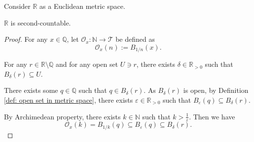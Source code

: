 \begin{proposition}
	Consider $\mathbb R$ as a Euclidean metric space.
	
	$\mathbb R$ is second-countable.
	
	\begin{proof}
		For any $x \in \mathbb Q$, let $\mathcal O_x: \mathbb N \to \mathcal T$ be defined as
		$$
		\mathcal O_x(n) := B_{1/n}(x).
		$$
		
		For any $r \in \mathbb R \setminus \mathbb Q$ and for any open set $U \ni r$, there exists $\delta \in \mathbb R_{> 0}$ such that $B_\delta(r) \subseteq U$.
		
		There exists some $q \in \mathbb Q$ such that $q \in B_\delta(r)$. As $B_\delta(r)$ is open, by Definition \ref{def: open set in metric space}, there exists $\varepsilon \in \mathbb R_{> 0}$ such that $B_\varepsilon(q) \subseteq B_\delta(r)$.
		
		By Archimedean property, there exists $k \in \mathbb N$ such that $k > \frac{1}{\varepsilon}$. Then we have
		$$
		\mathcal O_x(k) = B_{1/k}(q) \subseteq B_\varepsilon(q) \subseteq B_\delta(r).
		$$
	\end{proof}
\end{proposition}






































%